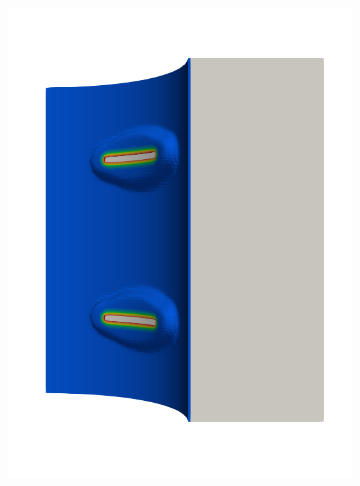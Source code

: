 \begin{frame}
\begin{columns}[T]
\begin{column}{0.6\textwidth}
\begin{figure}
{\begin{subfigure}{0.19\textwidth}
            \includegraphics[width=\textwidth]{examples/figures/seed_d_3}
          \end{subfigure}
          \hspace{0.06\textwidth}
          \begin{subfigure}{0.19\textwidth}
            \centering

\end{subfigure}}
\end{figure}
\end{column}
\end{columns}
\end{frame}
